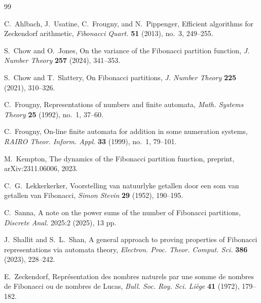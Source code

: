 \begin{thebibliography}{99}

C.~Ahlbach, J.~Usatine, C.~Frougny, and N.~Pippenger,
Efficient algorithms for Zeckendorf arithmetic,
\textit{Fibonacci Quart.} \textbf{51} (2013), no.~3, 249--255.

S.~Chow and O.~Jones,
On the variance of the Fibonacci partition function,
\textit{J. Number Theory} \textbf{257} (2024), 341--353.

S.~Chow and T.~Slattery,
On Fibonacci partitions,
\textit{J. Number Theory} \textbf{225} (2021), 310--326.

C.~Frougny,
Representations of numbers and finite automata,
\textit{Math. Systems Theory} \textbf{25} (1992), no.~1, 37--60.

C.~Frougny,
On-line finite automata for addition in some numeration systems,
\textit{RAIRO Theor. Inform. Appl.} \textbf{33} (1999), no.~1, 79--101.

M.~Kempton,
The dynamics of the Fibonacci partition function,
preprint, arXiv:2311.06006, 2023.

C.~G.~Lekkerkerker,
Voorstelling van natuurlyke getallen door een som van getallen van Fibonacci,
\textit{Simon Stevin} \textbf{29} (1952), 190--195.

C.~Sanna,
A note on the power sums of the number of Fibonacci partitions,
\textit{Discrete Anal.} 2025:2 (2025), 13 pp.

J.~Shallit and S.~L.~Shan,
A general approach to proving properties of Fibonacci representations via
automata theory,
\textit{Electron. Proc. Theor. Comput. Sci.} \textbf{386} (2023), 228--242.

E.~Zeckendorf,
Repr\'esentation des nombres naturels par une somme de nombres de Fibonacci ou
de nombres de Lucas,
\textit{Bull. Soc. Roy. Sci. Li\`ege} \textbf{41} (1972), 179--182.

\end{thebibliography}
